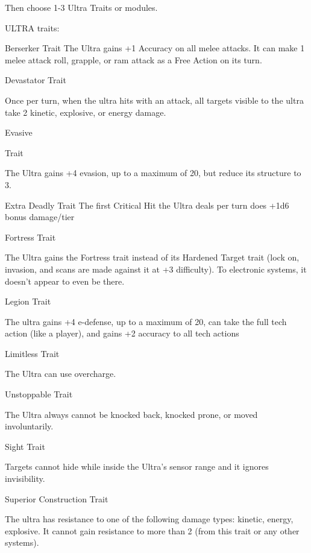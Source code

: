Then choose 1-3 Ultra Traits or modules.
 

ULTRA traits:
 

                                                                                                            


Berserker  
Trait  
The Ultra gains +1 Accuracy on all melee attacks. It can make 1 melee attack roll, grapple, or  
ram attack as a Free Action on its turn.
 

Devastator  
Trait
 
Once per turn, when the ultra hits with an attack, all targets visible to the ultra take 2 kinetic,  
explosive, or energy damage.
 

Evasive
 
Trait
 
The Ultra gains +4 evasion, up to a maximum of 20, but reduce its structure to 3.
 

Extra Deadly  
Trait  
The first Critical Hit the Ultra deals per turn does +1d6 bonus damage/tier
 

Fortress  
Trait
 
The Ultra gains the Fortress trait instead of its Hardened Target trait (lock on, invasion, and scans  
are made against it at +3 difficulty). To electronic systems, it doesn’t appear to even be there.
 

Legion  
Trait
 
The ultra gains +4 e-defense, up to a maximum of 20, can take the full tech action (like a player),  
and gains +2 accuracy to all tech actions
 

Limitless  
Trait
 
The Ultra can use overcharge.
 

Unstoppable  
Trait
 
The Ultra always cannot be knocked back, knocked prone, or moved involuntarily.
 

Sight  
Trait
 
Targets cannot hide while inside the Ultra’s sensor range and it ignores invisibility.
 

Superior Construction  
Trait
 
The ultra has resistance to one of the following damage types: kinetic, energy, explosive. It  
cannot gain resistance to more than 2 (from this trait or any other systems).
 

                                                                                                                        



